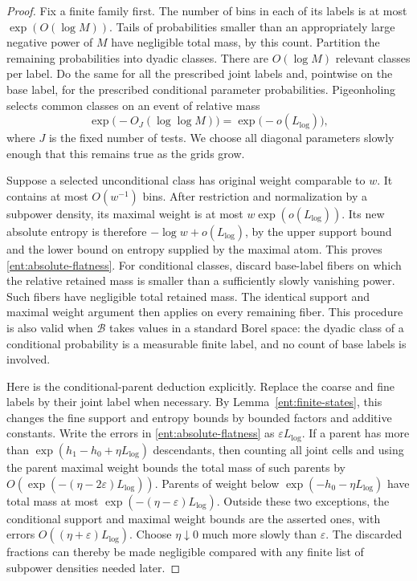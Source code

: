 \begin{proof}
Fix a finite family first.  The number of bins in each of its labels
is at most $\exp(O(\log M))$.  Tails of probabilities smaller than an
appropriately large negative power of $M$ have negligible total mass,
by this count.  Partition the remaining probabilities into dyadic
classes.  There are $O(\log M)$ relevant classes per label.  Do the
same for all the prescribed joint labels and, pointwise on the base
label, for the prescribed conditional parameter probabilities.
Pigeonholing selects common classes on an event of relative mass
\[
\exp\bigl(-O_J(\log\log M)\bigr)
       =\exp\bigl(-o(L_{\log})\bigr),
\]
where $J$ is the fixed number of tests.  We choose all diagonal
parameters slowly enough that this remains true as the grids grow.

Suppose a selected unconditional class has original weight comparable
to $w$.  It contains at most $O(w^{-1})$ bins.  After restriction and
normalization by a subpower density, its maximal weight is at most
$w\exp(o(L_{\log}))$.  Its new absolute entropy is therefore
$-\log w+o(L_{\log})$, by the upper support bound and the lower bound
on entropy supplied by the maximal atom.  This proves
\eqref{ent:absolute-flatness}.  For conditional classes, discard
base-label fibers on which the relative retained mass is smaller
than a sufficiently slowly vanishing power.  Such fibers have
negligible total retained mass.  The identical support and maximal
weight argument then applies on every remaining fiber.  This
procedure is also valid when $\mathcal B$ takes values in a standard
Borel space: the dyadic class of a conditional probability is a
measurable finite label, and no count of base labels is involved.

Here is the conditional-parent deduction explicitly.  Replace the
coarse and fine labels by their joint label when necessary.  By
Lemma~\ref{ent:finite-states}, this changes the fine support and
entropy bounds by bounded factors and additive constants.  Write the
errors in \eqref{ent:absolute-flatness} as $\varepsilon L_{\log}$.
If a parent has more than
$\exp(h_1-h_0+\eta L_{\log})$ descendants, then counting all joint
cells and using the parent maximal weight bounds the total mass of
such parents by $O(\exp(-(\eta-2\varepsilon)L_{\log}))$.
Parents of weight below $\exp(-h_0-\eta L_{\log})$ have total mass
at most $\exp(-(\eta-\varepsilon)L_{\log})$.  Outside these two
exceptions, the conditional support and maximal weight bounds are
the asserted ones, with errors $O((\eta+\varepsilon)L_{\log})$.
Choose $\eta\downarrow0$ much more slowly than $\varepsilon$.
The discarded fractions can thereby be made negligible compared
with any finite list of subpower densities needed later.


\end{proof}
